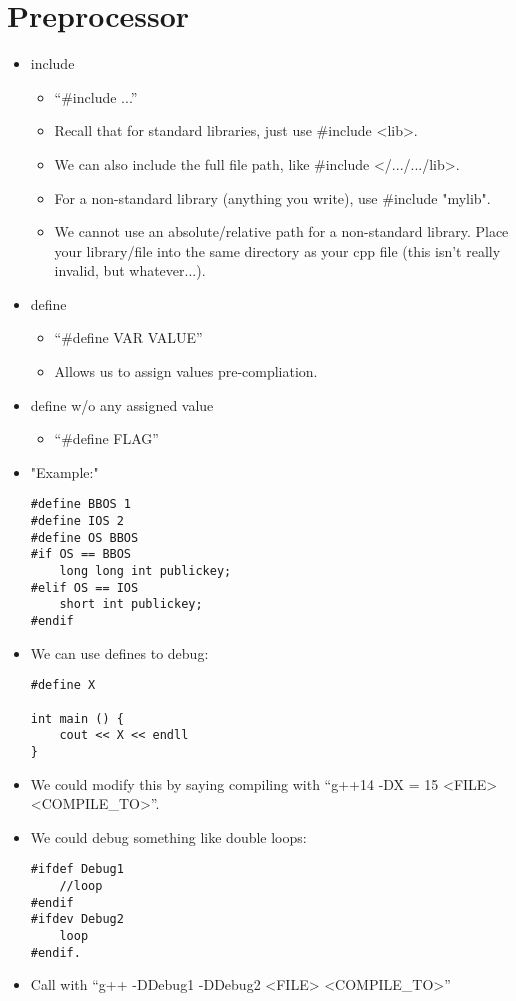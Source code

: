\documentclass{article}
\begin{document}
\section{Preprocessor}
\begin{itemize}
\item include
\begin{itemize}
\item ``#include ...''
\item Recall that for standard libraries, just use #include <lib>.
\item We can also include the full file path, like #include </.../.../lib>.
\item For a non-standard library (anything you write), use #include "mylib".
\item We cannot use an absolute/relative path for a non-standard library.  Place your library/file into the same directory as your cpp file (this isn't really invalid, but whatever...).
\end{itemize}

\item define
\begin{itemize}
\item ``#define VAR VALUE''
\item Allows us to assign values pre-compliation.
\end{itemize}

\item define w/o any assigned value
\begin{itemize}
\item ``#define FLAG''
\end{itemize}

\item "Example:"
\begin{lstlisting}
#define BBOS 1
#define IOS 2
#define OS BBOS
#if OS == BBOS 
    long long int publickey;
#elif OS == IOS
    short int publickey;
#endif
\end{lstlisting}
\item We can use defines to debug:
\begin{lstlisting}
#define X

int main () {
    cout << X << endll
}
\end{lstlisting}
\item We could modify this by saying compiling with ``g++14 -DX = 15 <FILE> <COMPILE\_TO>''.
\item We could debug something like double loops:
\begin{lstlisting}
#ifdef Debug1
    //loop
#endif
#ifdev Debug2
    loop
#endif.
\end{lstlisting}
\item Call with ``g++ -DDebug1 -DDebug2 <FILE> <COMPILE\_TO>''
\end{itemize}
\end{document}
